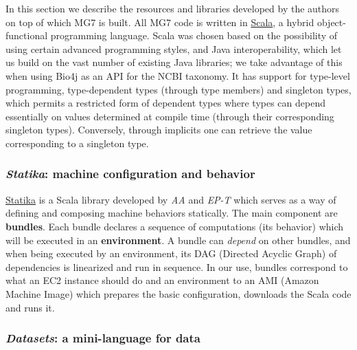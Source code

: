 \documentclass[fleqn,10pt,lineno]{wlpeerj}
\begin{document}
In this section we describe the resources and libraries developed by the
authors on top of which MG7 is built. All MG7 code is written in
\protect\hyperlink{scala}{Scala}, a hybrid object-functional programming
language. Scala was chosen based on the possibility of using certain
advanced programming styles, and Java interoperability, which let us
build on the vast number of existing Java libraries; we take advantage
of this when using Bio4j as an API for the NCBI taxonomy. It has support
for type-level programming, type-dependent types (through type members)
and singleton types, which permits a restricted form of dependent types
where types can depend essentially on values determined at compile time
(through their corresponding singleton types). Conversely, through
implicits one can retrieve the value corresponding to a singleton type.

\subsubsection{\texorpdfstring{\emph{Statika}: machine configuration and
behavior}{Statika: machine configuration and behavior}}\label{statika-machine-configuration-and-behavior}

\protect\hyperlink{statika}{Statika} is a Scala library developed by
\emph{AA} and \emph{EP-T} which serves as a way of defining and
composing machine behaviors statically. The main component are
\textbf{bundles}. Each bundle declares a sequence of computations (its
behavior) which will be executed in an \textbf{environment}. A bundle
can \emph{depend} on other bundles, and when being executed by an
environment, its DAG (Directed Acyclic Graph) of dependencies is
linearized and run in sequence. In our use, bundles correspond to what
an EC2 instance should do and an environment to an AMI (Amazon Machine
Image) which prepares the basic configuration, downloads the Scala code
and runs it.

\subsubsection{\texorpdfstring{\emph{Datasets}: a mini-language for
data}{Datasets: a mini-language for data}}\label{datasets-a-mini-language-for-data}
\end{document}
